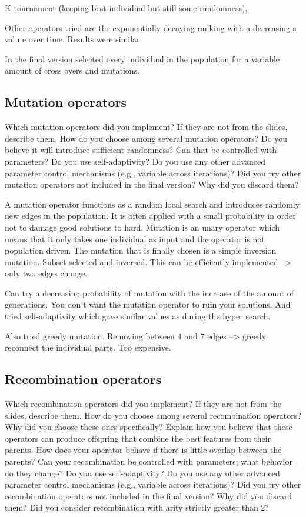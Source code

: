 \documentclass[a4paper,10pt]{article}
\newcommand{\ReplaceMe}[1]{{\color{blue}#1}}
\begin{document}
K-tournament (keeping best individual but still some randomness),

Other operators tried are the exponentially decaying ranking with a decreasing s valu  e over time. Results were similar. 

In the final version selected every individual in the population for a variable amount of cross overs and mutations. 




\subsection{Mutation operators}

\ReplaceMe{Which mutation operators did you implement? If they are not from the slides, describe them. How do you choose among several mutation operators? Do you believe it will introduce sufficient randomness? Can that be controlled with parameters? Do you use self-adaptivity? Do you use any other advanced parameter control mechanisms (e.g., variable across iterations)? Did you try other mutation operators not included in the final version? Why did you discard them?}

A mutation operator functions as a random local search and introduces randomly new edges in the population. It is often applied with a small probability in order not to damage good solutions to hard. Mutation is an unary operator which means that it only takes one individual as input and the operator is not population driven.
The mutation that is finally chosen is a simple inversion mutation. Subset selected and inversed. This can be efficiently implemented --> only two edges change. 

Can try a decreasing probability of mutation with the increase of the amount of generations. You don't want the mutation operator to ruin your solutions. And tried self-adaptivity which gave similar values as during the hyper search. 

Also tried greedy mutation. Removing between $4$ and $7$ edges --> greedy reconnect the individual parts. Too expensive. 



\subsection{Recombination operators}

\ReplaceMe{Which recombination operators did you implement? If they are not from the slides, describe them. How do you choose among several recombination operators? Why did you choose these ones specifically? Explain how you believe that these operators can produce offspring that combine the best features from their parents. How does your operator behave if there is little overlap between the parents? Can your recombination be controlled with parameters; what behavior do they change? Do you use self-adaptivity? Do you use any other advanced parameter control mechanisms (e.g., variable across iterations)? Did you try other recombination operators not included in the final version? Why did you discard them? Did you consider recombination with arity strictly greater than 2?}
\end{document}

